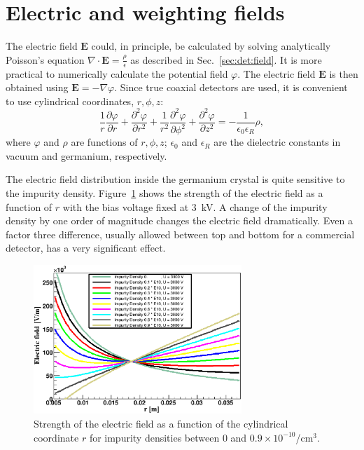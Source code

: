  
\section{Electric and weighting fields} 
\label{sec:pss:field} 
The electric field $\mathbf{E}$ could, in principle, be calculated by
solving analytically Poisson's equation $\nabla \cdot \mathbf{E} =
\frac{\rho}{\epsilon}$ as described in Sec.~\ref{sec:det:field}. It is
more practical to numerically calculate the potential field
$\varphi$. The electric field $\mathbf{E}$ is then obtained using
$\mathbf{E} = - \nabla \varphi$. Since true coaxial detectors are
used, it is convenient to use cylindrical coordinates, $r, \phi, z$:
\begin{equation} 
\frac{1}{r} \frac{\partial \varphi}{\partial r} + \frac{\partial^{2} \varphi}{\partial r^{2}} + \frac{1}{r^{2}} \frac{\partial^{2} \varphi}{\partial \phi^{2}} + 
\frac{\partial^{2} \varphi}{\partial z^{2}} = - \frac{1}{\epsilon_{0} 
\epsilon_{R}} \rho, 
\label{eq:pss:pocyl} 
\end{equation} 
where $\varphi$ and $\rho$ are functions of $r, \phi, z$;
$\epsilon_{0}$ and $\epsilon_{R}$ are the dielectric constants in
vacuum and germanium, respectively.
 
The electric field distribution inside the germanium crystal is quite
sensitive to the impurity density. Figure~\ref{fig:pss:rho} shows the
strength of the electric field as a function of $r$ with the bias
voltage fixed at 3~kV.  A change of the impurity density by one order
of magnitude changes the electric field dramatically. Even a factor
three difference, usually allowed between top and bottom for a
commercial detector, has a very significant effect.

 
\begin{figure}[htbp] 
\centering 
\includegraphics[width=0.7\textwidth]{rho} 
\caption{Strength of the electric field as a function of the
cylindrical coordinate $r$ for impurity densities between 0 and $0.9
\times 10^{-10}$/cm$^{3}$.}
\label{fig:pss:rho} 
\end{figure} 
 
